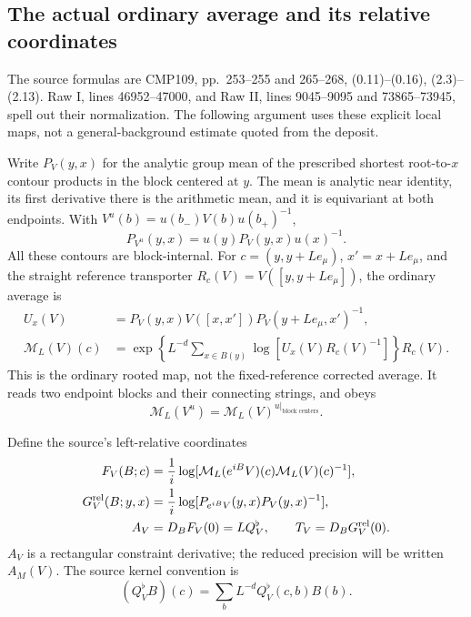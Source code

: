 \documentclass[11pt]{article}
\begin{document}
\subsection{The actual ordinary average and its relative coordinates}
\label{pc-source-maps}

The source formulas are CMP109, pp.~253--255 and 265--268,
(0.11)--(0.16), (2.3)--(2.13). Raw I, lines 46952--47000, and
Raw II, lines 9045--9095 and 73865--73945, spell out their
normalization. The following argument uses these explicit local
maps, not a general-background estimate quoted from the deposit.

Write $P_V(y,x)$ for the analytic group mean of the prescribed
shortest root-to-$x$ contour products in the block centered at
$y$. The mean is analytic near identity, its first derivative
there is the arithmetic mean, and it is equivariant at both
endpoints. With $V^u(b)=u(b_-)V(b)u(b_+)^{-1}$,
\begin{equation}\label{pc-contour-gauge}
 P_{V^u}(y,x)=u(y)P_V(y,x)u(x)^{-1}.
\end{equation}
All these contours are block-internal. For
$c=(y,y+Le_\mu)$, $x'=x+Le_\mu$, and the straight reference
transporter $R_c(V)=V([y,y+Le_\mu])$, the ordinary average is
\begin{equation}\label{pc-ordinary-map}
 \begin{split}
 U_x(V)&=P_V(y,x)V([x,x'])P_V(y+Le_\mu,x')^{-1},\\
 \mathcal M_L(V)(c)&=
 \exp\left\{L^{-d}\sum_{x\in B(y)}
      \log[U_x(V)R_c(V)^{-1}]\right\}R_c(V).
 \end{split}
\end{equation}
This is the ordinary rooted map, not the fixed-reference
corrected average. It reads two endpoint blocks and their
connecting strings, and obeys
\[
 \mathcal M_L(V^u)=
 \mathcal M_L(V)^{u|_{\text{block centers}}}.
\]

Define the source's left-relative coordinates
\begin{equation}\label{pc-relative-maps}
 \begin{split}
 F_V(B;c)&=\frac1i\log[
  \mathcal M_L(e^{iB}V)(c)\mathcal M_L(V)(c)^{-1}],\\
 G^{\rm rel}_V(B;y,x)&=\frac1i\log[
  P_{e^{iB}V}(y,x)P_V(y,x)^{-1}],\\
 A_V&=D_BF_V(0)=LQ_V^\flat,\qquad
 T_V=D_BG^{\rm rel}_V(0).
 \end{split}
\end{equation}
$A_V$ is a rectangular constraint derivative; the reduced
precision will be written $A_M(V)$. The source kernel convention is
\begin{equation}\label{pc-kernel-convention}
 (Q_V^\flat B)(c)=\sum_b L^{-d}Q_V^\flat(c,b)B(b).
\end{equation}
\end{document}
